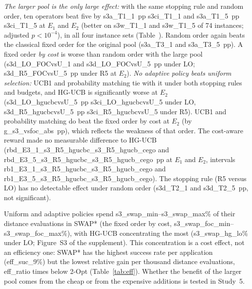 \emph{The larger pool is the only large effect:} with the same stopping rule and random order, ten operators beat five by \num{s3a_T1_1}~pp \num{s3ci_T1_1} and \num{s3a_T1_5}~pp \num{s3ci_T1_5} at $E_1$ and $E_2$ (better on \num{s3w_T1_1} and \num{s3w_T1_5} of 74 instances; adjusted $p<10^{-4}$), in all four instance sets (Table~). Random order again beats the classical fixed order for the original pool (\num{s3a_T3_1} and \num{s3a_T3_5}~pp). A fixed order \emph{by cost} is worse than random order with the large pool (\num{s3d_LO_FOCvsU_1} and \num{s3d_LO_FOCvsU_5}~pp under LO; \num{s3d_R5_FOCvsU_5}~pp under R5 at $E_2$). \emph{No adaptive policy beats uniform selection:} UCB1 and probability matching tie with it under both stopping rules and budgets, and HG-UCB is significantly worse at $E_2$ (\num{s3d_LO_hgucbcvsU_5}~pp \num{s3ci_LO_hgucbcvsU_5} under LO, \num{s3d_R5_hgucbcvsU_5}~pp \num{s3ci_R5_hgucbcvsU_5} under R5). UCB1 and probability matching do beat the fixed order by cost at $E_2$ (by \num{g_s3_vsfoc_abs}~pp), which reflects the weakness of that order. The cost-aware reward made no measurable difference to HG-UCB (\num{rbd_E3_1_s3_R5_hgucbc_s3_R5_hgucb_cego} and \num{rbd_E3_5_s3_R5_hgucbc_s3_R5_hgucb_cego}~pp at $E_1$ and $E_2$, intervals \num{rb1_E3_1_s3_R5_hgucbc_s3_R5_hgucb_cego} and \num{rb1_E3_5_s3_R5_hgucbc_s3_R5_hgucb_cego}). The stopping rule (R5 versus LO) has no detectable effect under random order (\num{s3d_T2_1} and \num{s3d_T2_5}~pp, not significant).

Uniform and adaptive policies spend \num{s3_swap_min}--\num{s3_swap_max}\% of their distance evaluations in SWAP* (the fixed order by cost, \num{s3_swap_foc_min}--\num{s3_swap_foc_max}\%), with HG-UCB concentrating the most (\num{s3_swap_hg_lo}\% under LO; Figure~S3 of the supplement). This concentration is a cost effect, not an efficiency one: SWAP* has the highest success rate per application (\num{eff_suc_9}\%) but the lowest relative gain per thousand distance evaluations, \num{eff_ratio} times below 2-Opt (Table~\ref{tab:eff}). Whether the benefit of the larger pool comes from the cheap or from the expensive additions is tested in Study~5.



